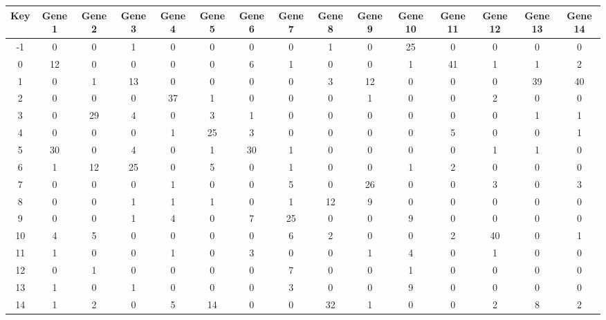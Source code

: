 \begin{tabular}{|c|c|c|c|c|c|c|c|c|c|c|c|c|c|c|}
\hline
Key & Gene 1 & Gene 2 & Gene 3 & Gene 4 & Gene 5 & Gene 6 & Gene 7 & Gene 8 & Gene 9 & Gene 10 & Gene 11 & Gene 12 & Gene 13 & Gene 14 \\
\hline
-1 & 0 & 0 & 1 & 0 & 0 & 0 & 0 & 1 & 0 & 25 & 0 & 0 & 0 & 0 \\
0 & 12 & 0 & 0 & 0 & 0 & 6 & 1 & 0 & 0 & 1 & 41 & 1 & 1 & 2 \\
1 & 0 & 1 & 13 & 0 & 0 & 0 & 0 & 3 & 12 & 0 & 0 & 0 & 39 & 40 \\
2 & 0 & 0 & 0 & 37 & 1 & 0 & 0 & 0 & 1 & 0 & 0 & 2 & 0 & 0 \\
3 & 0 & 29 & 4 & 0 & 3 & 1 & 0 & 0 & 0 & 0 & 0 & 0 & 1 & 1 \\
4 & 0 & 0 & 0 & 1 & 25 & 3 & 0 & 0 & 0 & 0 & 5 & 0 & 0 & 1 \\
5 & 30 & 0 & 4 & 0 & 1 & 30 & 1 & 0 & 0 & 0 & 0 & 1 & 1 & 0 \\
6 & 1 & 12 & 25 & 0 & 5 & 0 & 1 & 0 & 0 & 1 & 2 & 0 & 0 & 0 \\
7 & 0 & 0 & 0 & 1 & 0 & 0 & 5 & 0 & 26 & 0 & 0 & 3 & 0 & 3 \\
8 & 0 & 0 & 1 & 1 & 1 & 0 & 1 & 12 & 9 & 0 & 0 & 0 & 0 & 0 \\
9 & 0 & 0 & 1 & 4 & 0 & 7 & 25 & 0 & 0 & 9 & 0 & 0 & 0 & 0 \\
10 & 4 & 5 & 0 & 0 & 0 & 0 & 6 & 2 & 0 & 0 & 2 & 40 & 0 & 1 \\
11 & 1 & 0 & 0 & 1 & 0 & 3 & 0 & 0 & 1 & 4 & 0 & 1 & 0 & 0 \\
12 & 0 & 1 & 0 & 0 & 0 & 0 & 7 & 0 & 0 & 1 & 0 & 0 & 0 & 0 \\
13 & 1 & 0 & 1 & 0 & 0 & 0 & 3 & 0 & 0 & 9 & 0 & 0 & 0 & 0 \\
14 & 1 & 2 & 0 & 5 & 14 & 0 & 0 & 32 & 1 & 0 & 0 & 2 & 8 & 2 \\
\hline
\end{tabular}